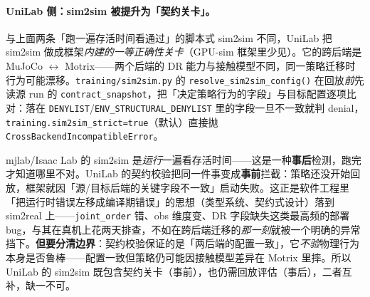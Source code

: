 \paragraph{UniLab 侧：sim2sim 被提升为「契约关卡」。}与上面两条「跑一遍存活时间看通过」的脚本式 sim2sim 不同，UniLab 把 sim2sim 做成框架\emph{内建的一等正确性关卡}（GPU-sim 框架里少见）。它的跨后端是 MuJoCo $\leftrightarrow$ Motrix——两个后端的 DR 能力与接触模型不同，同一策略迁移时行为可能漂移。\texttt{training/sim2sim.py} 的 \texttt{resolve\_sim2sim\_config()} 在回放\emph{前}先读源 run 的 \verb|contract_snapshot|，把「决定策略行为的字段」与目标配置逐项比对：落在 \verb|DENYLIST|/\verb|ENV_STRUCTURAL_DENYLIST| 里的字段一旦不一致就判 denial，\verb|training.sim2sim_strict=true|（默认）直接抛 \texttt{CrossBackendIncompatibleError}。

\begin{insight}\label{ins:rlmc-s2r-contract}
mjlab/Isaac Lab 的 sim2sim 是\emph{运行}一遍看存活时间——这是一种\textbf{事后}检测，跑完才知道哪里不对。UniLab 的契约校验把同一件事变成\textbf{事前}拦截：策略还没开始回放，框架就因「源/目标后端的关键字段不一致」启动失败。这正是软件工程里「把运行时错误左移成编译期错误」的思想（类型系统、契约式设计）落到 sim2real 上——\verb|joint_order| 错、obs 维度变、DR 字段缺失这类最高频的部署 bug，与其在真机上花两天排查，不如在跨后端迁移的\emph{那一刻}就被一个明确的异常挡下。\textbf{但要分清边界}：契约校验保证的是「两后端的配置一致」，它\emph{不验}物理行为本身是否鲁棒——配置一致但策略仍可能因接触模型差异在 Motrix 里摔。所以 UniLab 的 sim2sim 既包含契约关卡（事前），也仍需回放评估（事后），二者互补，缺一不可。
\end{insight}

